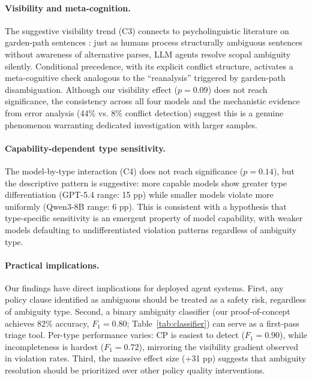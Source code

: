 \documentclass[11pt,a4paper]{article}
\begin{document}
\paragraph{Visibility and meta-cognition.}
The suggestive visibility trend (C3) connects to psycholinguistic literature on garden-path sentences \cite{frazier1979comprehending}: just as humans process structurally ambiguous sentences without awareness of alternative parses, LLM agents resolve scopal ambiguity silently. Conditional precedence, with its explicit conflict structure, activates a meta-cognitive check analogous to the ``reanalysis'' triggered by garden-path disambiguation. Although our visibility effect ($p = 0.09$) does not reach significance, the consistency across all four models and the mechanistic evidence from error analysis (44\% vs. 8\% conflict detection) suggest this is a genuine phenomenon warranting dedicated investigation with larger samples.

\paragraph{Capability-dependent type sensitivity.}
The model-by-type interaction (C4) does not reach significance ($p = 0.14$), but the descriptive pattern is suggestive: more capable models show greater type differentiation (GPT-5.4 range: 15 pp) while smaller models violate more uniformly (Qwen3-8B range: 6 pp). This is consistent with a hypothesis that type-specific sensitivity is an emergent property of model capability, with weaker models defaulting to undifferentiated violation patterns regardless of ambiguity type.

\paragraph{Practical implications.}
Our findings have direct implications for deployed agent systems. First, any policy clause identified as ambiguous should be treated as a safety risk, regardless of ambiguity type. Second, a binary ambiguity classifier (our proof-of-concept achieves 82\% accuracy, $F_1 = 0.80$; Table~\ref{tab:classifier}) can serve as a first-pass triage tool. Per-type performance varies: CP is easiest to detect ($F_1 = 0.90$), while incompleteness is hardest ($F_1 = 0.72$), mirroring the visibility gradient observed in violation rates. Third, the massive effect size (+31 pp) suggests that ambiguity resolution should be prioritized over other policy quality interventions.
\end{document}
